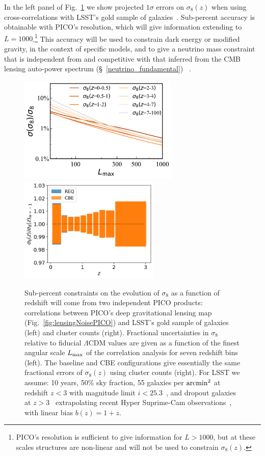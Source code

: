 \documentclass[PICOAPC.tex]{subfiles}
\begin{document}
In the left panel of Fig.~\ref{fig:sigma8}  we show projected $1\sigma$ errors on $\sigma_8(z)$ when using cross-correlations with LSST's gold sample of galaxies~\citep{LSSTSciBook}.  Sub-percent accuracy is obtainable with PICO's resolution, which will give information extending to $L =1000$.\footnote{PICO's resolution is sufficient to give information for $L>1000$, but at these scales structures are non-linear and will not be used to constrain $\sigma_{8}(z)$.} This accuracy will be used to constrain dark energy or modified gravity, in the context of specific models, and to give a neutrino mass constraint that is independent from and competitive with that inferred from the CMB lensing auto-power spectrum (\S~\ref{neutrino_fundamental})~\citep{2018arXiv180902120Y} .

\begin{figure}
\centering
\hspace{-0.15in}
\includegraphics[width=3in]{images/PICO_s8_lmax_PICOv4.1b_deproj0_SENS0_LSST10yrGold.pdf}
\hspace{-0.1in}
\includegraphics[width=2.65in,trim= 0cm -0.25cm 0cm 0cm]{images/PICOs8.png}
\vspace{-0.14in}
\caption{\captiontext  
Sub-percent constraints on the evolution of $\sigma_{8}$ as a function of redshift will come from two independent PICO products: correlations between PICO's deep gravitational lensing map (Fig.~\ref{fig:lensingNoisePICO}) and LSST's gold sample of galaxies (left) and cluster counts (right). Fractional uncertainties in $\sigma_{8}$ relative to fiducial $\Lambda$CDM values are given as a function of the finest angular scale $L_{\rm max}$ of the correlation analysis for seven redshift bins (left).  The baseline and CBE configurations give essentially the same fractional errors of $\sigma_{8}(z)$ using cluster counts (right).  For LSST we assume: 10 years, 50\% sky fraction, 55 galaxies per ${\rm arcmin}^{2}$ at redshift $z<3$ with magnitude limit $i <25.3$~\citep{LSSTSciBook}, and dropout galaxies at $z>3$~\citep{dropouts} extrapolating recent Hyper Suprime-Cam observations~\cite{Schmittfull/Seljak,HSC1,HSC2}, with linear bias $b(z)=1+z$.
\label{fig:sigma8} }
\vspace{-0.16in}
\end{figure}
\end{document}

